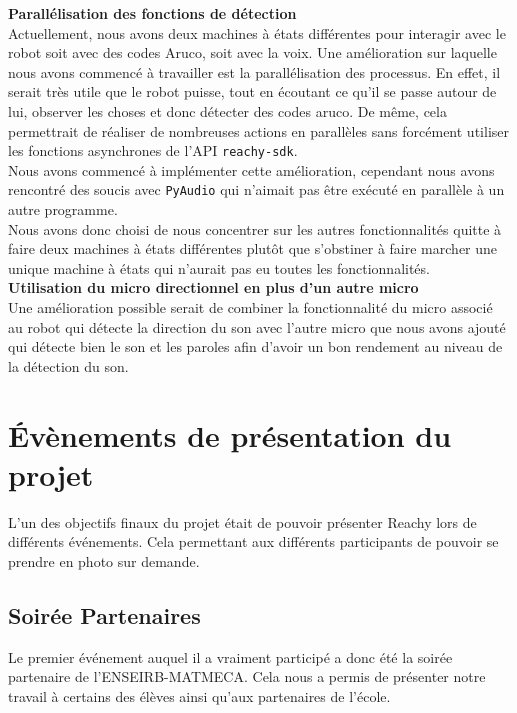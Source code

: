 \documentclass[a4paper,french]{article}
\begin{document}
\textbf{Parallélisation des fonctions de détection} \\ 

Actuellement, nous avons deux machines à états différentes pour interagir avec le robot soit avec des codes Aruco, soit avec la voix. Une amélioration sur laquelle nous avons commencé à travailler est la parallélisation des processus. En effet, il serait très utile que le robot puisse, tout en écoutant ce qu'il se passe autour de lui, observer les choses et donc détecter des codes aruco. De même, cela permettrait de réaliser de nombreuses actions en parallèles sans forcément utiliser les fonctions asynchrones de l'API \texttt{reachy-sdk}. \\ Nous avons commencé à implémenter cette amélioration, cependant nous avons rencontré des soucis avec \texttt{PyAudio} qui n'aimait pas être exécuté en parallèle à un autre programme. \\ Nous avons donc choisi de nous concentrer sur les autres fonctionnalités quitte à faire deux machines à états différentes plutôt que s'obstiner à faire marcher une unique machine à états qui n'aurait pas eu toutes les fonctionnalités. \\

\textbf{Utilisation du micro directionnel en plus d'un autre micro} \\ 

Une amélioration possible serait de combiner la fonctionnalité du  micro associé au robot qui détecte la direction du son avec l'autre micro que nous avons ajouté qui détecte bien le son et les paroles afin d'avoir un bon rendement au niveau de la détection du son.

\section{Évènements de présentation du projet}
L'un des objectifs finaux du projet était de pouvoir présenter Reachy lors de différents événements. Cela permettant aux différents participants de pouvoir se prendre en photo sur demande.

\subsection{Soirée Partenaires}
Le premier événement auquel il a vraiment participé a donc été la soirée partenaire de l'ENSEIRB-MATMECA. Cela nous a permis de présenter notre travail à certains des élèves ainsi qu'aux partenaires de l'école.\\
\end{document}
